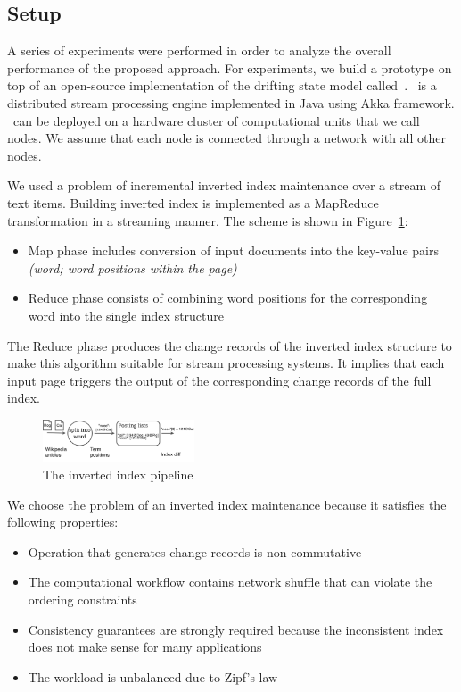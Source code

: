 
\label {fs-experiments-seciton}

\subsection{Setup}
A series of experiments were performed in order to analyze the overall performance of the proposed approach. For experiments, we build a prototype on top of an open-source implementation of the drifting state model called~\FlameStream. \FlameStream\ is a distributed stream processing engine implemented in Java using Akka framework. \FlameStream\ can be deployed on a hardware cluster of computational units that we call nodes. We assume that each node is connected through a network with all other nodes.

We used a problem of incremental inverted index maintenance over a stream of text items. 
Building inverted index is implemented as a MapReduce transformation in a streaming manner. The scheme is shown in Figure~\ref{index}: 

\begin{itemize}
    \item Map phase includes conversion of input documents into the key-value pairs {\it (word; word positions within the page)}
    \item Reduce phase consists of combining word positions for the corresponding word into the single index structure 
\end{itemize}

The Reduce phase produces the change records of the inverted index structure to make this algorithm suitable for stream processing systems. It implies that each input page triggers the output of the corresponding change records of the full index.

\begin{figure}[htbp]
  \centering
  \includegraphics[width=0.40\textwidth]{pics/index}
  \caption{The inverted index pipeline}
  \label {index}
\end{figure}

We choose the problem  of  an inverted index maintenance  because it satisfies the following properties:

\begin{itemize}
    \item Operation that generates change records is non-commutative
    \item The computational workflow    contains network shuffle that can violate the ordering constraints
    \item Consistency guarantees are strongly required because the inconsistent index does not make sense for many applications
    \item The workload is unbalanced due to Zipf's law
\end{itemize}

